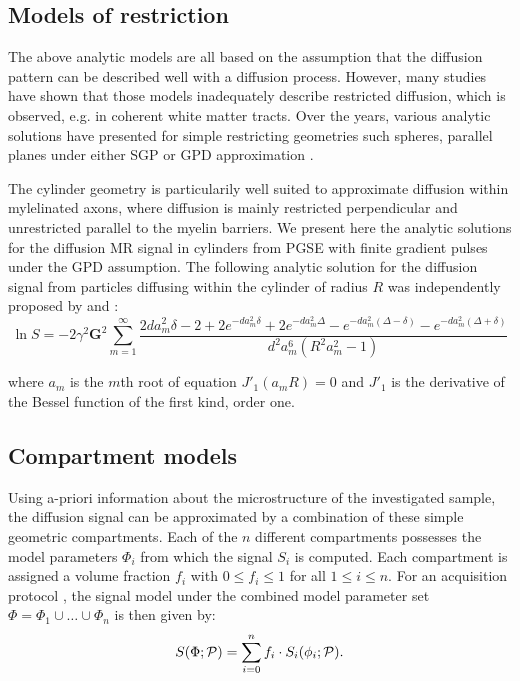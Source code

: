 \subsection{Models of restriction}
The above analytic models are all based on the assumption that the diffusion pattern can be described well with a diffusion process. However, many studies have shown that those models inadequately describe restricted diffusion, which is observed, e.g. in coherent white matter tracts. Over the years, various analytic solutions have presented for simple restricting geometries such spheres, parallel planes under either SGP or GPD approximation \citep{Balinov:1993, Linse:1995, Callaghan:1996}.

The cylinder geometry is particularily well suited to approximate diffusion within mylelinated axons, where diffusion is mainly restricted perpendicular and unrestricted parallel to the myelin barriers. We present here the analytic solutions for the diffusion MR signal in cylinders from PGSE with finite gradient pulses under the \gls{GPD} assumption. The following analytic solution for the diffusion signal from particles diffusing within the cylinder of radius $R$ was independently proposed by \citet{Stepisnik:1993} and \citet{Vangelderen:1994}:
{\scriptsize
\begin{equation}
\ln S = -2\gamma^{2}\textbf{G}^{2}\sum_{m=1}^{\infty}\frac{2da_{m}^{2}\delta-2+2e^{-da_{m}^{2}\delta}+2e^{-da_{m}^{2}\Delta}- e^{-da_{m}^{2}(\Delta-\delta)} -e^{-da_{m}^{2}(\Delta+\delta)}}{d^{2}a_{m}^{6}(R^{2}a_{m}^{2}- 1)}
\label{biganal}
\end{equation}
}

where  $a_{m}$ is the $m$th root of equation  $J'_{1}(a_{m}R)= 0$ and $J'_{1}$ is the derivative of the Bessel function of the first kind, order one.

\subsection{Compartment models}
\label{sec:multicompartment_modeling}
Using a-priori information about the microstructure of the investigated sample, the diffusion signal can be approximated by a combination of these simple geometric compartments. Each of the $n$ different compartments possesses the model parameters $\Phi_{i}$ from which the signal $S_i$ is computed. Each compartment is assigned a volume fraction $f_i$ with $0 \le f_i \le 1$ for all $1 \le i \le n$. For an acquisition protocol \prot{}, the signal model under the combined model parameter set $\Phi=\Phi_{1}\cup\dots\cup\Phi_{n}$ is then given by:
\begin{equation}
	S(\Phi;\mathcal{P})=\sum_{i=0}^{n}f_i\cdot S_i(\phi_i;\mathcal{P}).
\end{equation}

